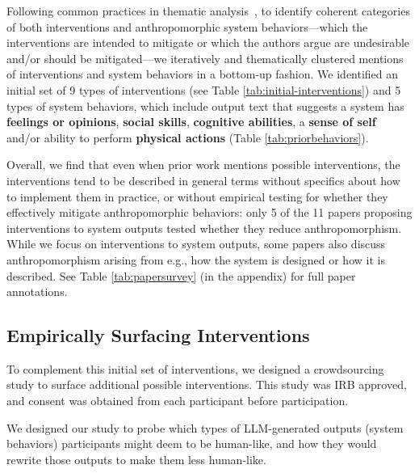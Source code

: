 \documentclass[11pt]{article}
\newcounter{intervention}  %
\newcommand{\cb}{behaviors}
\newcommand{\ant}{anthropomorphism\xspace}
\newcommand{\para}[1]{\smallskip \noindent {\bf #1}}
\begin{document}
Following common practices in thematic analysis~\cite{braun2012thematic}, to identify coherent categories of both interventions and anthropomorphic system \cb---which the interventions are intended to mitigate or which the authors argue are undesirable and/or should be mitigated---we iteratively and thematically clustered mentions of interventions and system behaviors in a bottom-up fashion. 
We identified an initial set of 9 types of interventions (see Table \ref{tab:initial-interventions}) and 5 types of system \cb, which include output text that suggests a system has \textbf{feelings or opinions}, \textbf{social skills}, \textbf{cognitive abilities}, a \textbf{sense of self} and/or ability to perform \textbf{physical actions} (Table \ref{tab:priorbehaviors}).


Overall, we find that even when prior work mentions possible interventions, the interventions tend to be described in general terms without specifics about how to implement them in practice, or without empirical testing for whether they effectively mitigate anthropomorphic behaviors: only 5 of the 11 papers proposing interventions to system outputs tested whether they reduce anthropomorphism.
While we focus on interventions to system outputs, some papers also discuss \ant arising from e.g., how the system is designed or how it is described. 
See Table \ref{tab:papersurvey} (in the appendix) for full paper annotations.


\subsection{Empirically Surfacing Interventions}
\label{sec:crowdsource}

To complement this initial set of interventions, we designed a crowdsourcing study to surface additional possible interventions.  
This study was IRB approved, and consent was obtained from each participant before participation. 

\para{Crowdsourcing task design.} 
We designed our study to probe which types of LLM-generated outputs (system behaviors) participants might deem to be human-like, and how they would rewrite those outputs to make them less human-like.
\end{document}
